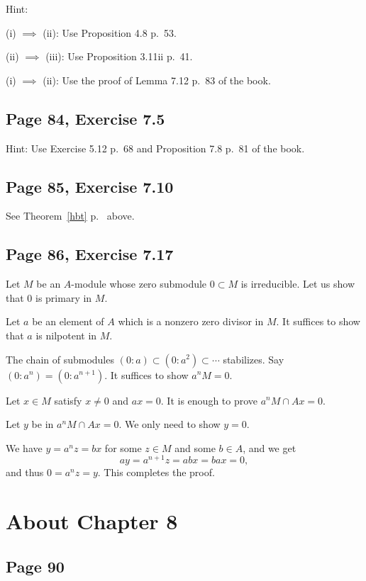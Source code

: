 \documentclass[parskip=half,fontsize=12pt]{scrartcl}%
\begin{document}
Hint: 

(i) $\implies$ (ii): Use Proposition 4.8 p.~53. 

(ii) $\implies$ (iii): Use Proposition 3.11ii p.~41.

(i) $\implies$ (ii): Use the proof of Lemma 7.12 p.~83 of the book.

\subsection{Page 84, Exercise 7.5}%

Hint: Use Exercise 5.12 p.~68 and Proposition 7.8 p.~81 of the book.

\subsection{Page 85, Exercise 7.10}%

See Theorem~\ref{hbt} p.~\pageref{hbt} above.

\subsection{Page 86, Exercise 7.17}%

Let $M$ be an $A$-module whose zero submodule $0\subset M$ is irreducible. Let us show that $0$ is primary in $M$. 

Let $a$ be an element of $A$ which is a nonzero zero divisor in $M$. It suffices to show that $a$ is nilpotent in $M$. 

The chain of submodules $(0:a)\subset(0:a^2)\subset\cdots$ stabilizes. Say $(0:a^n)=(0:a^{n+1})$. It suffices to show $a^nM=0$. 

Let $x\in M$ satisfy $x\ne0$ and $ax=0$. It is enough to prove $a^nM\cap Ax=0$. 

Let $y$ be in $a^nM\cap Ax=0$. We only need to show $y=0$. 

We have $y=a^nz=bx$ for some $z\in M$ and some $b\in A$, and we get 
$$
ay=a^{n+1}z=abx=bax=0,
$$ 
and thus $0=a^nz=y$. This completes the proof.%

\section{About Chapter 8}%

\subsection{Page 90}\label{90}%
\end{document}
